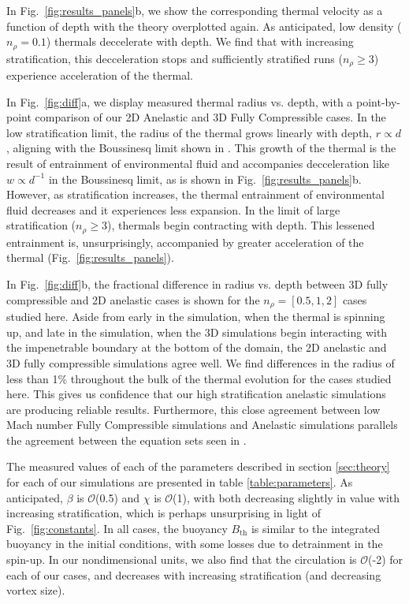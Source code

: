 \documentclass[twocolumn, amsmath, amsfonts, amssymb, trackchanges]{aastex62}
\newcommand{\LJ}{\citetalias{lecoanet&jeevanjee2018}}
\begin{document}
In Fig.~\ref{fig:results_panels}b, we show the corresponding thermal velocity as a function of depth with the theory overplotted again.
As anticipated, low density ($n_\rho = 0.1$) thermals deccelerate with depth.
We find that with increasing stratification, this decceleration stops and sufficiently stratified runs ($n_\rho \geq 3$) experience acceleration of the thermal.

In Fig.~\ref{fig:diff}a, we display measured thermal radius vs. depth, with a point-by-point comparison of our 2D Anelastic and 3D Fully Compressible cases. 
In the low stratification limit, the radius of the thermal grows linearly with depth, $r \propto d$, aligning with the Boussinesq limit shown in \LJ.
This growth of the thermal is the result of entrainment of environmental fluid and accompanies decceleration like $w \propto d^{-1}$ in the Boussinesq limit, as is shown in Fig.~\ref{fig:results_panels}b.
However, as stratification increases, the thermal entrainment of environmental fluid decreases and it experiences less expansion.
In the limit of large stratification ($n_\rho \geq 3$), thermals begin contracting with depth.
This lessened entrainment is, unsurprisingly, accompanied by greater acceleration of the thermal (Fig.~\ref{fig:results_panels}).

In Fig.~\ref{fig:diff}b, the fractional difference in radius vs. depth between 3D fully compressible and 2D anelastic cases is shown for the $n_\rho = [0.5, 1, 2]$ cases studied here. 
Aside from early in the simulation, when the thermal is spinning up, and late in the simulation, when the 3D simulations begin interacting with the impenetrable boundary at the bottom of the domain, the 2D anelastic and 3D fully compressible simulations agree well.
We find differences in the radius of less than 1\% throughout the bulk of the thermal evolution for the cases studied here.
This gives us confidence that our high stratification anelastic simulations are producing reliable results.
Furthermore, this close agreement between low Mach number Fully Compressible simulations and Anelastic simulations parallels the agreement between the equation sets seen in \citet{lecoanet&all2014}.

The measured values of each of the parameters described in section \ref{sec:theory} for each of our simulations are presented in table \ref{table:parameters}.
As anticipated, $\beta$ is $\mathcal{O}$(0.5) and $\chi$ is $\mathcal{O}$(1), with both decreasing slightly in value with increasing stratification, which is perhaps unsurprising in light of Fig.~\ref{fig:constants}.
In all cases, the buoyancy $B_{\text{th}}$ is similar to the integrated buoyancy in the initial conditions, with some losses due to detrainment in the spin-up.
In our nondimensional units, we also find that the circulation is $\mathcal{O}$(-2) for each of our cases, and decreases with increasing stratification (and decreasing vortex size).
\end{document}

